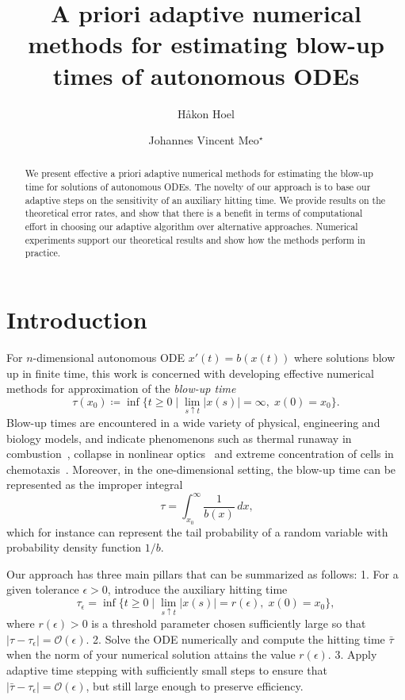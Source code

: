 \documentclass[a4paper, oneside, reqno]{amsart}
\title[A priori adaptive numerical methods for blow-up times of ODEs]{A priori adaptive numerical methods for estimating blow-up times of autonomous ODEs}
\author{H{\aa}kon Hoel}
\author{Johannes Vincent Meo$^\star$}
\newcommand{\abs}[1]{\left\lvert#1\right\rvert}
\theoremstyle{remark}
\begin{document}
\begin{abstract}
We present effective a priori adaptive numerical methods for estimating the blow-up time for solutions of autonomous ODEs.
The novelty of our approach is to base our adaptive steps on the sensitivity of an auxiliary hitting time.
We provide results on the theoretical error rates, and show that there is a benefit in terms of computational effort in choosing our adaptive algorithm over alternative approaches. 
Numerical experiments support our theoretical results and show how the methods perform in practice. 
\end{abstract}

\maketitle

\section{Introduction}
For $n$-dimensional autonomous ODE \(x'(t) = b(x(t))\) where solutions blow up in finite time,
this work is concerned with developing effective numerical methods for approximation of the \emph{blow-up time}
\begin{equation*}
    \tau(x_0) \coloneqq \inf\Big\{t \geq 0 \mid \lim_{s\uparrow t}\abs{x(s)} = \infty, \; x(0) = x_0\Big\}.
\end{equation*}
Blow-up times are encountered in a wide variety of physical, engineering and biology models, and indicate phenomenons such as thermal runaway in combustion~\cite{Bebernes1989}, collapse in nonlinear optics~\cite{McLaughlin1986} and extreme concentration of cells in chemotaxis~\cite{Winkler2013}.  Moreover, in the one-dimensional setting, the blow-up time can be represented as the improper integral 
\[\
\tau = \int_{x_0}^\infty\frac{1}{b(x)}\,dx,
\]
which for instance can represent the tail probability of a random variable with probability density function $1/b$. 

Our approach has three main pillars that can be summarized as follows: 1. For a given tolerance $\epsilon>0$,
introduce the auxiliary hitting time 
\[
\tau_\epsilon = \inf\Big\{t \geq 0 \mid \lim_{s\uparrow t}\abs{x(s)} = r(\epsilon), \; x(0) = x_0\Big\},
\]
where $r(\epsilon)>0$ is a threshold parameter chosen sufficiently large so that $|\tau- \tau_\epsilon| = \mathcal{O}(\epsilon)$. 
2. Solve the ODE numerically and compute the hitting time $\bar \tau$ when the norm of your numerical solution attains the value $r(\epsilon)$. 
3. Apply adaptive time stepping with sufficiently small steps to ensure that $|\bar \tau - \tau_\epsilon| = \mathcal{O}(\epsilon)$, but still large enough to preserve efficiency. 
\end{document}

